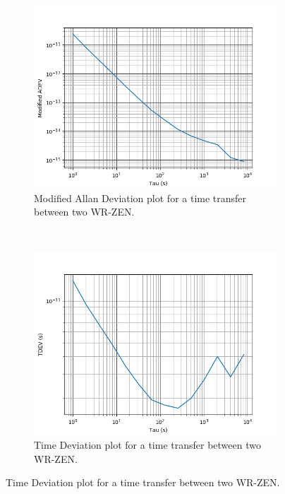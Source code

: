 \begin{figure}
	\centering
	\begin{subfigure}[t]{0.48\textwidth}
		\includegraphics[width=\textwidth]{img/mdev_exp1}
		\caption[MDEV plot for the WR-ZEN]{Modified Allan Deviation plot for a 
		time transfer between two WR-ZEN.}
		\label{fig:mdev_exp1}
	\end{subfigure}
	~ %
	\begin{subfigure}[t]{0.48\textwidth}
		\includegraphics[width=\textwidth]{img/tdev_exp1}
		\caption[TDEV plot for the WR-ZEN]{Time Deviation plot for a time 
		transfer between two WR-ZEN.}
		\label{fig:tdev_exp1}
	\end{subfigure}
	

\end{figure}
